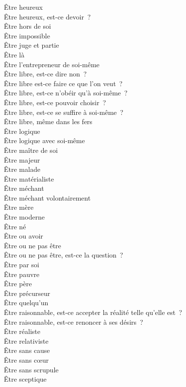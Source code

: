 \documentclass[a4paper,12pt]{article}
\begin{document}
Être heureux \\
Être heureux, est-ce devoir ? \\
Être hors de soi \\
Être impossible \\
Être juge et partie \\
Être là \\
Être l'entrepreneur de soi-même \\
Être libre, est-ce dire non ? \\
Être libre est-ce faire ce que l'on veut ? \\
Être libre, est-ce n'obéir qu'à soi-même ? \\
Être libre, est-ce pouvoir choisir ? \\
Être libre, est-ce se suffire à soi-même ? \\
Être libre, même dans les fers \\
Être logique \\
Être logique avec soi-même \\
Être maître de soi \\
Être majeur \\
Être malade \\
Être matérialiste \\
Être méchant \\
Être méchant volontairement \\
Être mère \\
Être moderne \\
Être né \\
Être ou avoir \\
Être ou ne pas être \\
Être ou ne pas être, est-ce la question ? \\
Être par soi \\
Être pauvre \\
Être père \\
Être précurseur \\
Être quelqu'un \\
Être raisonnable, est-ce accepter la réalité telle qu'elle est ? \\
Être raisonnable, est-ce renoncer à ses désirs ? \\
Être réaliste \\
Être relativiste \\
Être sans cause \\
Être sans cœur \\
Être sans scrupule \\
Être sceptique \\
\end{document}
